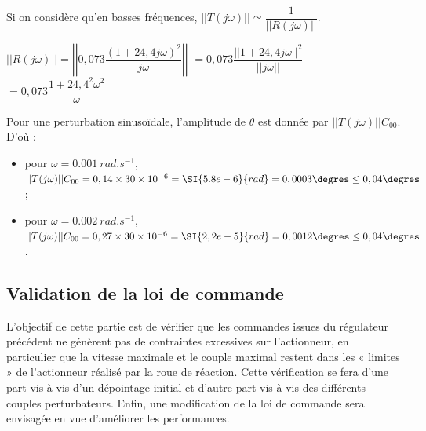 \ifprof
\begin{corrige}

Si on considère qu'en basses fréquences,  $||T(j\omega)||\simeq \dfrac{1}{|| R\left(j\omega\right)||}$.


$|| R\left(j\omega\right)|| = \left|\left| 0,073  \dfrac{\left(1+24,4 j \omega\right)^2}{j\omega}\right|\right|$
$=0,073  \dfrac{ \left|\left| 1+24,4 j \omega \right|\right| ^2}{ \left|\left| j\omega\right|\right|}$
$=0,073  \dfrac{ 1+24,4^2  \omega^2 }{ \omega}$

Pour une perturbation sinusoïdale, l'amplitude de $\theta$ est donnée par $||T(j\omega)|| C_{00}$.  D'où :
\begin{itemize}
\item pour $\omega = \SI{0,001}{rad.s^{-1}}$, $||T(j\omega)|| C_{00} = 0,14 \times 30 \times 10^{-6} = \SI{5.8e-6}{rad} = 0,0003\degres\leq 0,04\degres$;
\item pour $\omega = \SI{0,002}{rad.s^{-1}}$, $||T(j\omega)|| C_{00} = 0,27 \times 30 \times 10^{-6} = \SI{2,2e-5}{rad} = 0,0012\degres\leq 0,04\degres$.
\end{itemize}
%  
\end{corrige}
\else
\fi

\subsection{\label{sec:3:D} Validation de la loi de commande}
\ifprof
\else
\begin{obj}
L’objectif de cette partie est de vérifier que les commandes issues du régulateur précédent ne
génèrent pas de contraintes excessives sur l’actionneur, en particulier que la vitesse maximale
et le couple maximal restent dans les « limites » de l’actionneur réalisé par la roue de réaction.
Cette vérification se fera d’une part vis-à-vis d’un dépointage initial et d’autre part vis-à-vis des
différents couples perturbateurs. Enfin, une modification de la loi de commande sera envisagée en
vue d’améliorer les performances.
\end{obj}

